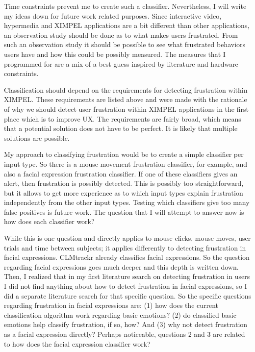 Time constraints prevent me to create such a classifier. Nevertheless, I will write my ideas down for future work related purposes. Since interactive video, hypermedia and XIMPEL applications are a bit different than other applications, an observation study should be done as to what makes users frustrated. From such an observation study it should be possible to see what frustrated behaviors users have and how this could be possibly measured. The measures that I programmed for are a mix of a best guess inspired by literature and hardware constraints.

Classification should depend on the requirements for detecting frustration within XIMPEL. These requirements are listed above and were made with the rationale of why we should detect user frustration within XIMPEL applications in the first place which is to improve UX. The requirements are fairly broad, which means that a potential solution does not have to be perfect. It is likely that multiple solutions are possible.

My approach to classifying frustration would be to create a simple classifier per input type. So there is a mouse movement frustration classifier, for example, and also a facial expression frustration classifier. If one of these classifiers gives an alert, then frustration is possibly detected. This is possibly too straightforward, but it allows to get more experience as to which input types explain frustration independently from the other input types. Testing which classifiers give too many false positives is future work. The question that I will attempt to answer now is how does each classifier work?

While this is one question and directly applies to mouse clicks, mouse moves, user trials and time between subjects; it applies differently to detecting frustration in facial expressions. CLMtrackr already classifies facial expressions. So the question regarding facial expressions goes much deeper and this depth is written down. Then, I realized that in my first literature search on detecting frustration in users I did not find anything about how to detect frustration in facial expressions, so I did a separate literature search for that specific question. So the specific questions regarding frustration in facial expressions are: (1) how does the current classification algorithm work regarding basic emotions? (2) do classified basic emotions help classify frustration, if so, how? And (3) why not detect frustration as a facial expression directly? Perhaps noticeable, questions 2 and 3 are related to how does the facial expression classifier work?

